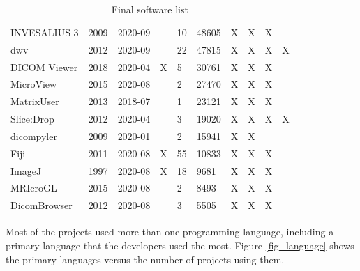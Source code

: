 \documentclass[3p, 12pt,authoryear]{elsarticle}
\begin{document}
\begin{table}[ht]
\begin{tabular}{llllllllll}
INVESALIUS 3 \citep{Amorim2015} & 2009 & 2020-09 &  & 10 & 48605 & X & X & X &  \\
dwv \citep{Martelli2021} & 2012 & 2020-09 &  & 22 & 47815 & X & X & X & X \\
DICOM Viewer \citep{Afsar2021} & 2018 & 2020-04 & X & 5 & 30761 & X & X & X &  \\
MicroView \citep{ParallaxInnovations2020} & 2015 & 2020-08 &  & 2 & 27470 & X & X & X &  \\
MatrixUser \citep{Liu2016} & 2013 & 2018-07 &  & 1 & 23121 & X & X & X &  \\
Slice:Drop \citep{Haehn2013} & 2012 & 2020-04 &  & 3 & 19020 & X & X & X & X \\
dicompyler \citep{Panchal2010} & 2009 & 2020-01 &  & 2 & 15941 & X & X &  &  \\
Fiji \citep{Schindelin2012} & 2011 & 2020-08 & X & 55 & 10833 & X & X & X &  \\
ImageJ \citep{Rueden2017} & 1997 & 2020-08 & X & 18 & 9681 & X & X & X &  \\
MRIcroGL \citep{Rorden2021} & 2015 & 2020-08 &  & 2 & 8493 & X & X & X &  \\
DicomBrowser \citep{Archie2012} & 2012 & 2020-08 &  & 3 & 5505 & X & X & X &  \\ \hline
\end{tabular}
\caption{\label{tab_final_list}Final software list}
\end{table}

Most of the projects used more than one programming language, including a
primary language that the developers used the most. Figure \ref{fig_language}
shows the primary languages versus the number of projects using them.


\end{document}
